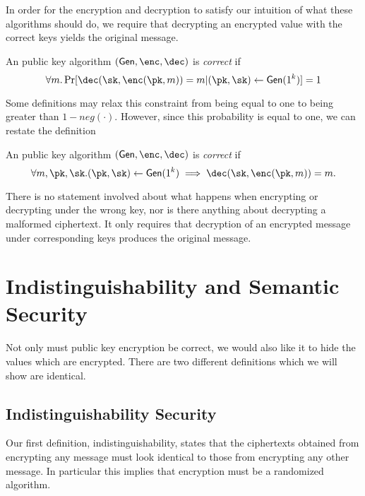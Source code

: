 In order for the encryption and decryption to satisfy our intuition of what these
algorithms should do, we require that decrypting an encrypted value with the
correct keys yields the original message.

\begin{definition}[Correctness]
An public key algorithm $(\gen, \enc, \dec)$ is \emph{correct} if
\begin{equation*}
\forall m . \Pr[\dec(\sk, \enc(\pk, m))=m | (\pk,\sk) \gets \gen(1^k)] = 1
\end{equation*}
\end{definition}

Some definitions may relax this constraint from being equal to one to being greater
than $1-neg(\cdot)$. However, since this probability is equal to one, we can restate
the definition

\begin{lemma}[Correctness]
An public key algorithm $(\gen, \enc, \dec)$ is \emph{correct} if
\begin{equation*}
\forall m, \pk,\sk . (\pk,\sk) \gets \gen(1^k) \implies \dec(\sk, \enc(\pk, m))=m.
\end{equation*}
\end{lemma}

There is no statement involved about what happens when encrypting or decrypting
under the wrong key, nor is there anything about decrypting a malformed ciphertext.
It only requires that decryption of an encrypted message under corresponding
keys produces the original message.

\section{Indistinguishability and Semantic Security}

Not only must public key encryption be correct, we would also like it to hide
the values which are encrypted. There are two different definitions which we
will show are identical.

\subsection{Indistinguishability Security}
Our first definition, indistinguishability, states that the ciphertexts
obtained from encrypting any message must look identical to those from encrypting
any other message. In particular this implies that encryption must be a randomized
algorithm.

